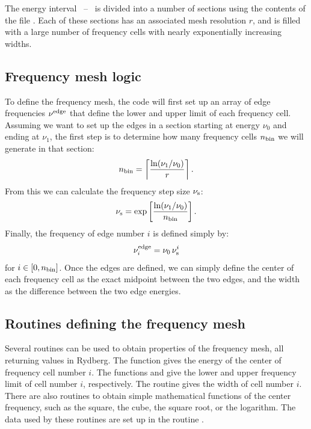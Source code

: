 The energy interval \emm\ -- \egamry\ is divided into a number of sections
using the contents of the file . Each of these
sections has an associated mesh resolution $r$, and is filled with a large
number of frequency cells with nearly exponentially increasing widths.

\subsection{Frequency mesh logic}

To define the frequency mesh, the code will first set up an array of edge
frequencies $\nu^{\rm edge}$ that define the lower and upper limit of each
frequency cell. Assuming we want to set up the edges in a section starting at
energy $\nu_0$ and ending at $\nu_1$, the first step is to determine how many
frequency cells $n_{\rm bin}$ we will generate in that section:
\begin{equation}
  n_{\rm bin} = \left\lceil \frac{\ln(\nu_1/\nu_0)}{r} \right\rceil.
\end{equation}
From this we can calculate the frequency step size $\nu_{\rm s}$:
\begin{equation}
  \nu_{\rm s} = \exp\left[ \frac{\ln(\nu_1/\nu_0)}{n_{\rm bin}} \right].
\end{equation}
Finally, the frequency of edge number $i$ is defined simply by:
\begin{equation}
  \nu^{\rm edge}_i = \nu_0 \, \nu_{\rm s}^i
\end{equation}
for $i \in [0,n_{\rm bin}]$. Once the edges are defined, we can simply define
the center of each frequency cell as the exact midpoint between the two edges,
and the width as the difference between the two edge energies.

\subsection{Routines defining the frequency mesh}

Several routines can be used to obtain properties of the frequency mesh, all
returning values in Rydberg. The function  gives the energy
of the center of frequency cell number $i$. The functions
 and  give the lower and upper
frequency limit of cell number $i$, respectively. The routine
 gives the width of cell number $i$. There are also
routines to obtain simple mathematical functions of the center frequency, such
as the square, the cube, the square root, or the logarithm. The data used by
these routines are set up in the routine .

